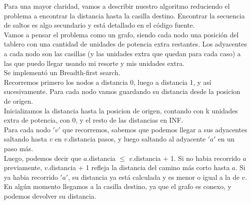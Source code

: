 \documentclass[11pt, a4paper, twoside]{article}
\begin{document}
{}
Para una mayor claridad, vamos a describir nuestro algoritmo reduciendo el problema a encontrar la distancia
hasta la casilla destino. Encontrar la secuencia de saltos es algo secundario y está detallado en el código fuente.\\
Vamos a pensar el problema como un grafo, siendo cada nodo una posición del tablero con una cantidad de unidades 
de potencia extra restantes. Los adyacentes a cada nodo son las casillas (y las unidades extra que quedan para 
cada caso) a las que puedo llegar usando mi resorte y mis unidades extra. \\
Se implementó un Breadth-first search. \\
Recorremos primero los nodos a distancia 0, luego a distancia 1, y así sucesivamente.
Para cada nodo vamos guardando su distancia desde la posicion de origen. \\
Inicializamos la distancia hasta la posicion de origen, contando con k unidades extra de potencia, con 0, y el 
resto de las distancias en INF.\\
Para cada nodo $'v'$ que recorremos, sabemos que podemos llegar a sus adyacentes saltando hasta $v$ en $v$.distancia 
pasos, y luego saltando al adyacente $'a'$ en un paso más. \\
Luego, podemos decir que $a$.distancia $\le$ $v$.distancia + 1. Si no habia recorrido $a$ previamente, 
$v$.distancia + 1 refleja la distancia del camino más corto hasta $a$. Si ya habia recorrido $'a'$, su 
distancia ya está calculada y es menor o igual a la de $v$. En algún momento llegamos a la casilla destino, 
ya que el grafo es conexo, y podemos devolver su distancia. \\

\end{document}
